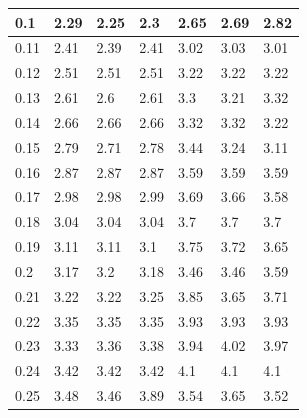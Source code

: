 \documentclass{jlreq}
\begin{document}
\begin{table}[H]
\begin{tabular}{|l|lll|lll|}
  0.1 & \multicolumn{1}{l|}{2.29} & \multicolumn{1}{l|}{2.25} & 2.3 & \multicolumn{1}{l|}{2.65} & \multicolumn{1}{l|}{2.69} & 2.82 \\ \hline
  0.11 & \multicolumn{1}{l|}{2.41} & \multicolumn{1}{l|}{2.39} & 2.41 & \multicolumn{1}{l|}{3.02} & \multicolumn{1}{l|}{3.03} & 3.01 \\ \hline
  0.12 & \multicolumn{1}{l|}{2.51} & \multicolumn{1}{l|}{2.51} & 2.51 & \multicolumn{1}{l|}{3.22} & \multicolumn{1}{l|}{3.22} & 3.22 \\ \hline
  0.13 & \multicolumn{1}{l|}{2.61} & \multicolumn{1}{l|}{2.6} & 2.61 & \multicolumn{1}{l|}{3.3} & \multicolumn{1}{l|}{3.21} & 3.32 \\ \hline
  0.14 & \multicolumn{1}{l|}{2.66} & \multicolumn{1}{l|}{2.66} & 2.66 & \multicolumn{1}{l|}{3.32} & \multicolumn{1}{l|}{3.32} & 3.22 \\ \hline
  0.15 & \multicolumn{1}{l|}{2.79} & \multicolumn{1}{l|}{2.71} & 2.78 & \multicolumn{1}{l|}{3.44} & \multicolumn{1}{l|}{3.24} & 3.11 \\ \hline
  0.16 & \multicolumn{1}{l|}{2.87} & \multicolumn{1}{l|}{2.87} & 2.87 & \multicolumn{1}{l|}{3.59} & \multicolumn{1}{l|}{3.59} & 3.59 \\ \hline
  0.17 & \multicolumn{1}{l|}{2.98} & \multicolumn{1}{l|}{2.98} & 2.99 & \multicolumn{1}{l|}{3.69} & \multicolumn{1}{l|}{3.66} & 3.58 \\ \hline
  0.18 & \multicolumn{1}{l|}{3.04} & \multicolumn{1}{l|}{3.04} & 3.04 & \multicolumn{1}{l|}{3.7} & \multicolumn{1}{l|}{3.7} & 3.7 \\ \hline
  0.19 & \multicolumn{1}{l|}{3.11} & \multicolumn{1}{l|}{3.11} & 3.1 & \multicolumn{1}{l|}{3.75} & \multicolumn{1}{l|}{3.72} & 3.65 \\ \hline
  0.2 & \multicolumn{1}{l|}{3.17} & \multicolumn{1}{l|}{3.2} & 3.18 & \multicolumn{1}{l|}{3.46} & \multicolumn{1}{l|}{3.46} & 3.59 \\ \hline
  0.21 & \multicolumn{1}{l|}{3.22} & \multicolumn{1}{l|}{3.22} & 3.25 & \multicolumn{1}{l|}{3.85} & \multicolumn{1}{l|}{3.65} & 3.71 \\ \hline
  0.22 & \multicolumn{1}{l|}{3.35} & \multicolumn{1}{l|}{3.35} & 3.35 & \multicolumn{1}{l|}{3.93} & \multicolumn{1}{l|}{3.93} & 3.93 \\ \hline
  0.23 & \multicolumn{1}{l|}{3.33} & \multicolumn{1}{l|}{3.36} & 3.38 & \multicolumn{1}{l|}{3.94} & \multicolumn{1}{l|}{4.02} & 3.97 \\ \hline
  0.24 & \multicolumn{1}{l|}{3.42} & \multicolumn{1}{l|}{3.42} & 3.42 & \multicolumn{1}{l|}{4.1} & \multicolumn{1}{l|}{4.1} & 4.1 \\ \hline
  0.25 & \multicolumn{1}{l|}{3.48} & \multicolumn{1}{l|}{3.46} & 3.89 & \multicolumn{1}{l|}{3.54} & \multicolumn{1}{l|}{3.65} & 3.52 \\ \hline
  \end{tabular}
  \end{table}
\end{document}
